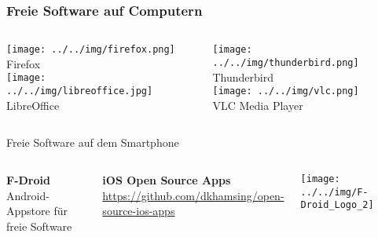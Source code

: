 \begin{frame}
  \frametitle{Freie Software auf Computern}
    \begin{columns}
        \begin{column}{5cm}
            \begin{center}
                \texttt{[image: ../../img/firefox.png]} \\
                Firefox \\
                \vspace{0.1\textheight}
                \texttt{[image: ../../img/libreoffice.jpg]}\\
                LibreOffice
            \end{center}
        \end{column}
        \begin{column}{5cm}
            \begin{center}
                \texttt{[image: ../../img/thunderbird.png]} \\
                Thunderbird \\
                \vspace{0.1\textheight}
                \texttt{[image: ../../img/vlc.png]}\\
                VLC Media Player
            \end{center}
        \end{column}
    \end{columns}
\end{frame}


\begin{frame}{Freie Software auf dem Smartphone}
  \begin{columns}
    \column{6.5cm}

    \textbf{F-Droid}\\
    Android-Appstore für freie Software

    \vspace{0.5cm}

    \textbf{iOS Open Source Apps}\\
    \url{https://github.com/dkhamsing/open-source-ios-apps}

    \column{5cm}

    \begin{center}
      \texttt{[image: ../../img/F-Droid\_Logo\_2]}
    \par\end{center}
    \begin{center}
    \par\end{center}
  \end{columns}
\end{frame}

